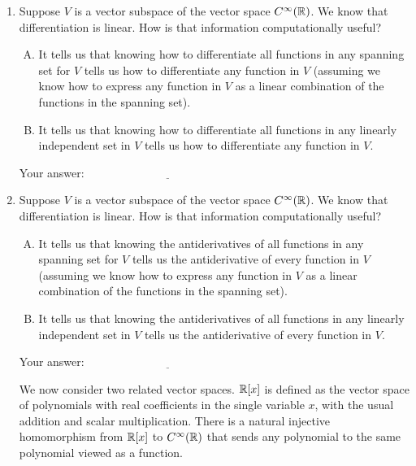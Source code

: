 \documentclass[10pt]{amsart}
\begin{document}
\vspace{0.5in}
\begin{enumerate}

\item Suppose $V$ is a vector subspace of the vector space
  $C^\infty(\mathbb{R})$. We know that differentiation is linear. How is that
  information computationally useful?

  \begin{enumerate}[(A)]
  \item It tells us that knowing how to differentiate all functions in
    any spanning set for $V$ tells us how to differentiate any
    function in $V$ (assuming we know how to express any function in
    $V$ as a linear combination of the functions in the spanning set).
  \item It tells us that knowing how to differentiate all functions in
    any linearly independent set in $V$ tells us how to differentiate any
    function in $V$.
  \end{enumerate}

  \vspace{0.1in}
  Your answer: $\underline{\qquad\qquad\qquad\qquad\qquad\qquad\qquad}$
  \vspace{0.1in}

\item Suppose $V$ is a vector subspace of the vector space
  $C^\infty(\mathbb{R})$. We know that differentiation is linear. How
  is that information computationally useful?

  \begin{enumerate}[(A)]
  \item It tells us that knowing the antiderivatives of all functions
    in any spanning set for $V$ tells us the antiderivative of every
    function in $V$ (assuming we know how to express any function in
    $V$ as a linear combination of the functions in the spanning set).
  \item It tells us that knowing the antiderivatives of all functions in
    any linearly independent set in $V$ tells us the antiderivative of every
    function in $V$.
  \end{enumerate}

  \vspace{0.1in}
  Your answer: $\underline{\qquad\qquad\qquad\qquad\qquad\qquad\qquad}$
  \vspace{0.1in}

  We now consider two related vector spaces. $\mathbb{R}[x]$ is defined as the
  vector space of polynomials with real coefficients in the single
  variable $x$, with the usual addition and scalar
  multiplication. There is a natural injective homomorphism from
  $\mathbb{R}[x]$ to $C^\infty(\mathbb{R})$ that sends any polynomial to the same
  polynomial viewed as a function.


\end{enumerate}
\end{document}

